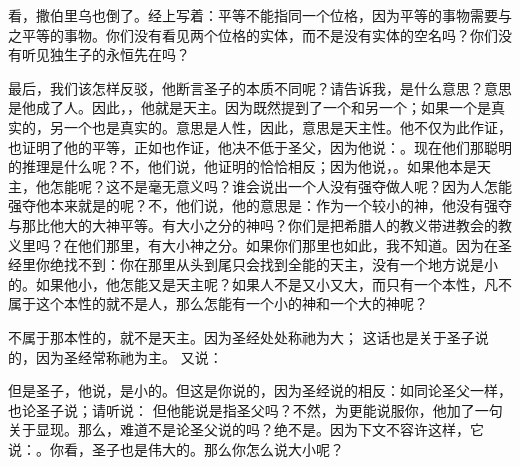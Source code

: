 看，撒伯里乌也倒了。经上写着：平等不能指同一个位格，因为平等的事物需要与之平等的事物。你们没有看见两个位格的实体，而不是没有实体的空名吗？你们没有听见独生子的永恒先在吗？\par

最后，我们该怎样反驳，他断言圣子的本质不同呢？请告诉我，是什么意思？意思是他成了人。因此，，他就是天主。因为既然提到了一个和另一个；如果一个是真实的，另一个也是真实的。意思是人性，因此，意思是天主性。他不仅为此作证，也证明了他的平等，正如也作证，他决不低于圣父，因为他说：。现在他们那聪明的推理是什么呢？不，他们说，他证明的恰恰相反；因为他说，。如果他本是天主，他怎能呢？这不是毫无意义吗？谁会说出一个人没有强夺做人呢？因为人怎能强夺他本来就是的呢？不，他们说，他的意思是：作为一个较小的神，他没有强夺与那比他大的大神平等。有大小之分的神吗？你们是把希腊人的教义带进教会的教义里吗？在他们那里，有大小神之分。如果你们那里也如此，我不知道。因为在圣经里你绝找不到：你在那里从头到尾只会找到全能的天主，没有一个地方说是小的。如果他小，他怎能又是天主呢？如果人不是又小又大，而只有一个本性，凡不属于这个本性的就不是人，那么怎能有一个小的神和一个大的神呢？\par

不属于那本性的，就不是天主。因为圣经处处称祂为大； 这话也是关于圣子说的，因为圣经常称祂为主。 又说： \par

但是圣子，他说，是小的。但这是你说的，因为圣经说的相反：如同论圣父一样，也论圣子说；请听说：  但他能说是指圣父吗？不然，为更能说服你，他加了一句关于显现。那么，难道不是论圣父说的吗？绝不是。因为下文不容许这样，它说：。你看，圣子也是伟大的。那么你怎么说大小呢？\par

